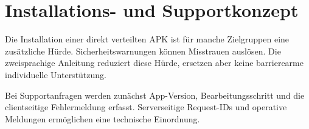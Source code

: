 \section{Installations- und Supportkonzept}
Die Installation einer direkt verteilten APK ist für manche Zielgruppen eine zusätzliche Hürde. Sicherheitswarnungen können Misstrauen auslösen. Die zweisprachige Anleitung reduziert diese Hürde, ersetzen aber keine barrierearme individuelle Unterstützung.

Bei Supportanfragen werden zunächst App-Version, Bearbeitungsschritt und die clientseitige Fehlermeldung erfasst. Serverseitige Request-IDs und operative Meldungen ermöglichen eine technische Einordnung.
